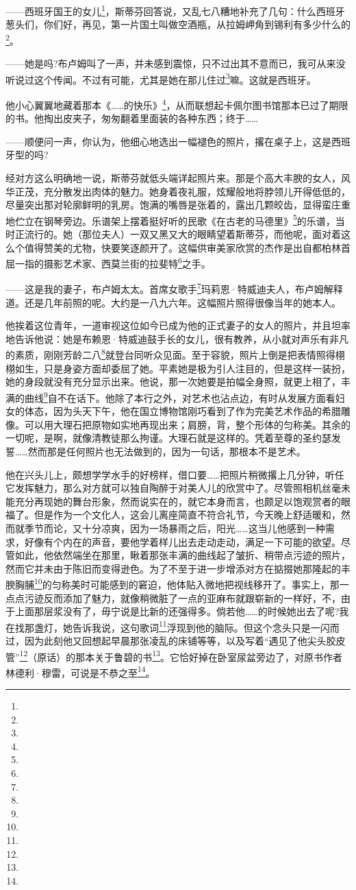 \par ——西班牙国王的女儿\footnote{}，斯蒂芬回答说，又乱七八糟地补充了几句：什么西班牙葱头们，你们好，再见，第一片国土叫做空酒瓶，从拉姆岬角到锡利有多少什么的\footnote{}。
\par ——她是吗?布卢姆叫了一声，并未感到震惊，只不过出其不意而已，我可从来没听说过这个传闻。不过有可能，尤其是她在那儿住过\footnote{}嘛。这就是西班牙。
\par 他小心翼翼地藏着那本《……的快乐》\footnote{}，从而联想起卡佩尔图书馆那本已过了期限的书。他掏出皮夹子，匆匆翻着里面装的各种东西；终于……
\par ——顺便问一声，你认为，他细心地选出一幅褪色的照片，撂在桌子上，这是西班牙型的吗?
\par 经对方这么明确地一说，斯蒂芬就低头端详起照片来。那是个高大丰腴的女人，风华正茂，充分散发出肉体的魅力。她身着夜礼服，炫耀般地将脖领儿开得低低的，尽量突出那对轮廓鲜明的乳房。饱满的嘴唇是张着的，露出几颗皎齿，显得蛮庄重地伫立在钢琴旁边。乐谱架上摆着挺好听的民歌《在古老的马德里》\footnote{}的乐谱，当时正流行的。她（那位夫人）一双又黑又大的眼睛望着斯蒂芬，而他呢，面对着这么个值得赞美的尤物，快要笑逐颜开了。这幅供审美家欣赏的杰作是出自都柏林首屈一指的摄影艺术家、西莫兰街的拉斐特\footnote{}之手。
\par ——这是我的妻子，布卢姆太太。首席女歌手\footnote{}玛莉恩·特威迪夫人，布卢姆解释道。还是几年前照的呢。大约是一八九六年。这幅照片照得很像当年的她本人。
\par 他挨着这位青年，一道审视这位如今已成为他的正式妻子的女人的照片，并且坦率地告诉他说：她是布赖恩·特威迪鼓手长的女儿，很有教养，从小就对声乐有非凡的素质，刚刚芳龄二八\footnote{}就登台同听众见面。至于容貌，照片上倒是把表情照得栩栩如生，只是身姿方面却委屈了她。平素她是极为引人注目的，但是这样一装扮，她的身段就没有充分显示出来。他说，那一次她要是拍幅全身照，就更上相了，丰满的曲线\footnote{}自不在话下。他除了本行之外，对艺术也沾点边，有时从发展方面看妇女的体态，因为头天下午，他在国立博物馆刚巧看到了作为完美艺术作品的希腊雕像。可以用大理石把原物如实地再现出来；肩膀，背，整个形体的匀称美。其余的一切呢，是啊，就像清教徒那么拘谨。大理石就是这样的。凭着至尊的圣约瑟发誓……然而那是任何照片也无法做到的，因为一句话，那根本不是艺术。
\par 他在兴头儿上，颇想学学水手的好榜样，借口要……把照片稍微撂上几分钟，听任它发挥魅力，那么对方就可以独自陶醉于对美人儿的欣赏中了。尽管照相机丝毫未能充分再现她的舞台形象，然而说实在的，就它本身而言，也颇足以饱观赏者的眼福了。但是作为一个文化人，这会儿离座简直不符合礼节，今天晚上舒适暖和，然而就季节而论，又十分凉爽，因为一场暴雨之后，阳光……这当儿他感到一种需求，好像有个内在的声音，要他学着样儿出去走动走动，满足一下可能的欲望。尽管如此，他依然端坐在那里，瞅着那张丰满的曲线起了皱折、稍带点污迹的照片，然而它并未由于陈旧而变得逊色。为了不至于进一步增添对方在掂掇她那隆起的丰腴胸脯\footnote{}的匀称美时可能感到的窘迫，他体贴入微地把视线移开了。事实上，那一点点污迹反而添加了魅力，就像稍微脏了一点的亚麻布就跟崭新的一样好，不，由于上面那层浆没有了，毋宁说是比新的还强得多。倘若他……的时候她出去了呢?我在找那盏灯，她告诉我说，这句歌词\footnote{}浮现到他的脑际。但这个念头只是一闪而过，因为此刻他又回想起早晨那张凌乱的床铺等等，以及写着“遇见了他尖头胶皮管”\footnote{}（原话）的那本关于鲁碧的书\footnote{}。它恰好掉在卧室尿盆旁边了，对原书作者林德利·穆雷，可说是不恭之至\footnote{}。
